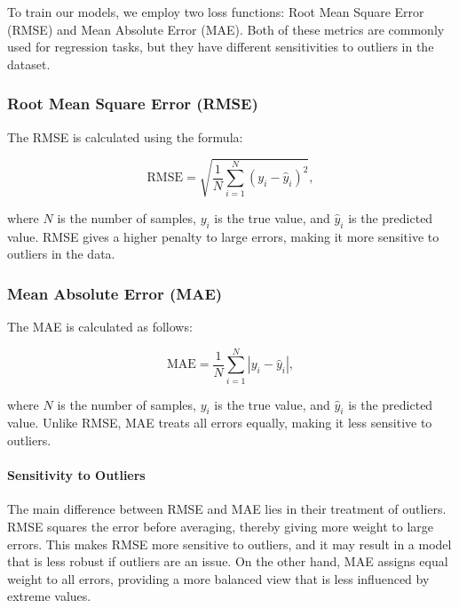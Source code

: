 \documentclass[a4paper,12pt,openright]{book}
\begin{document}
To train our models, we employ two loss functions: Root Mean Square Error (RMSE) and Mean Absolute Error (MAE). Both of these metrics are commonly used for regression tasks, but they have different sensitivities to outliers in the dataset.

\subsubsection{Root Mean Square Error (RMSE)}

The RMSE is calculated using the formula:

\begin{equation}
\text{RMSE} = \sqrt{\frac{1}{N} \sum_{i=1}^{N} (y_{i} - \hat{y}_{i})^2},
\end{equation}

where \(N\) is the number of samples, \(y_{i}\) is the true value, and \(\hat{y}_{i}\) is the predicted value. RMSE gives a higher penalty to large errors, making it more sensitive to outliers in the data.

\subsubsection{Mean Absolute Error (MAE)}

The MAE is calculated as follows:

\begin{equation}
\text{MAE} = \frac{1}{N} \sum_{i=1}^{N} |y_{i} - \hat{y}_{i}|,
\end{equation}

where \(N\) is the number of samples, \(y_{i}\) is the true value, and \(\hat{y}_{i}\) is the predicted value. Unlike RMSE, MAE treats all errors equally, making it less sensitive to outliers.

\paragraph{Sensitivity to Outliers}

The main difference between RMSE and MAE lies in their treatment of outliers. RMSE squares the error before averaging, thereby giving more weight to large errors. This makes RMSE more sensitive to outliers, and it may result in a model that is less robust if outliers are an issue. On the other hand, MAE assigns equal weight to all errors, providing a more balanced view that is less influenced by extreme values.
\end{document}
